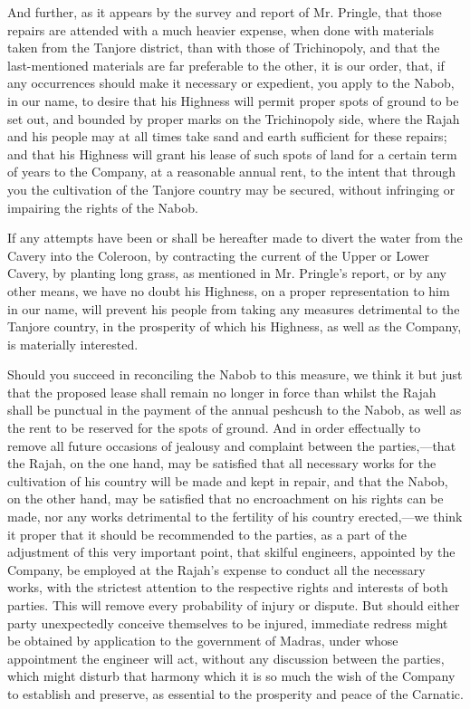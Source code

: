 And further, as it appears by the survey and report of Mr. Pringle, that those repairs are attended with a much heavier expense, when done with materials taken from the Tanjore district, than with those of Trichinopoly, and that the last-mentioned materials are far preferable to the other, it is our order, that, if any occurrences should make it necessary or expedient, you apply to the Nabob, in our name, to desire that his Highness will permit proper spots of ground to be set out, and bounded by proper marks on the Trichinopoly side, where the Rajah and his people may at all times take sand and earth sufficient for these repairs; and that his Highness will grant his lease of such spots of land for a certain term of years to the Company, at a reasonable annual rent, to the intent that through you the cultivation of the Tanjore country may be secured, without infringing or impairing the rights of the Nabob.

If any attempts have been or shall be hereafter made to divert the water from the Cavery into the Coleroon, by contracting the current of the Upper or Lower Cavery, by planting long grass, as mentioned in Mr. Pringle's report, or by any other means, we have no doubt his Highness, on a proper representation to him in our name, will prevent his people from taking any measures detrimental to the Tanjore country, in the prosperity of which his Highness, as well as the Company, is materially interested.

Should you succeed in reconciling the Nabob to this measure, we think it but just that the proposed lease shall remain no longer in force than whilst the Rajah shall be punctual in the payment of the annual peshcush to the Nabob, as well as the rent to be reserved for the spots of ground. And in order effectually to remove all future occasions of jealousy and complaint between the parties,—that the Rajah, on the one hand, may be satisfied that all necessary works for the cultivation of his country will be made and kept in repair, and that the Nabob, on the other hand, may be satisfied that no encroachment on his rights can be made, nor any works detrimental to the fertility of his country erected,—we think it proper that it should be recommended to the parties, as a part of the adjustment of this very important point, that skilful engineers, appointed by the Company, be employed at the Rajah's expense to conduct all the necessary works, with the strictest attention to the respective rights and interests of both parties. This will remove every probability of injury or dispute. But should either party unexpectedly conceive themselves to be injured, immediate redress might be obtained by application to the government of Madras, under whose appointment the engineer will act, without any discussion between the parties, which might disturb that harmony which it is so much the wish of the Company to establish and preserve, as essential to the prosperity and peace of the Carnatic.

